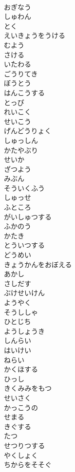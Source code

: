 \documentclass[8pt]{extreport}
\begin{document}
\begin{CJK}{UTF8}{min}
\\	おぎなう
\\	しゅわん
\\	とく
\\	えいきょうをうける
\\	むよう
\\	さける
\\	いたわる
\\	ごうりてき
\\	ぼうとう
\\	はんこうする
\\	とっぴ
\\	れいこく
\\	せいこう
\\	げんどうりょく
\\	しゅっしん
\\	かたやぶり
\\	せいか
\\	ざつよう
\\	みぶん
\\	そういくふう
\\	しゅっせ
\\	ふところ
\\	がいしゅつする
\\	ふかのう
\\	かたき
\\	とういつする
\\	どうめい
\\	きょうかんをおぼえる
\\	あかし
\\	さしだす
\\	ぶけせいけん
\\	ようやく
\\	そうししゃ
\\	ひとじち
\\	ようしょうき
\\	しんらい
\\	はいけい
\\	ねらい
\\	かくほする
\\	ひっし
\\	きくみみをもつ
\\	せいさく
\\	かっこうの
\\	せまる
\\	きぐする
\\	たつ
\\	せつりつする
\\	やくしょく
\\	ちからをそそぐ

\end{CJK}
\end{document}
